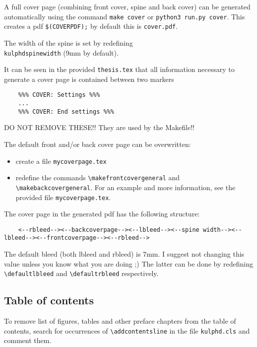 A full cover page (combining front cover, spine and back cover) can be
generated automatically using the command \texttt{make cover} or \texttt{python3 run.py cover}. This creates a pdf
\texttt{\$(COVERPDF);} by default this is \texttt{cover.pdf}.

The width of the spine is set by redefining \texttt{\\kulphdspinewidth} (9mm by default).

It can be seen in the provided \texttt{thesis.tex} that all information necessary to
generate a cover page is contained between two markers

\begin{verbatim}
    %%% COVER: Settings %%%
    ...
    %%% COVER: End settings %%%
\end{verbatim}

DO NOT REMOVE THESE!! They are used by the Makefile!!

The default front and/or back cover page can be overwritten: 

\begin{itemize}
    \item create a file \texttt{mycoverpage.tex}
    \item redefine the commands \texttt{\textbackslash makefrontcovergeneral} and \texttt{\textbackslash makebackcovergeneral}. For
          an example and more information, see the provided file \texttt{mycoverpage.tex}.
\end{itemize}

The cover page in the generated pdf has the following structure:

{\tiny
\begin{verbatim}
    <--rbleed--><--backcoverpage--><--lbleed--><--spine width--><--lbleed--><--frontcoverpage--><--rbleed-->
\end{verbatim}
}

The default bleed (both lbleed and rbleed) is 7mm. I suggest not changing this
value unless you know what you are doing ;) The latter can be done by
redefining \texttt{\textbackslash defaultlbleed} and \texttt{\textbackslash defaultrbleed} respectively.


\subsection{Table of contents}

To remove list of figures, tables and other preface chapters from the table of
contents, search for occurrences of \texttt{\textbackslash addcontentsline} in the file
\texttt{kulphd.cls} and comment them.

